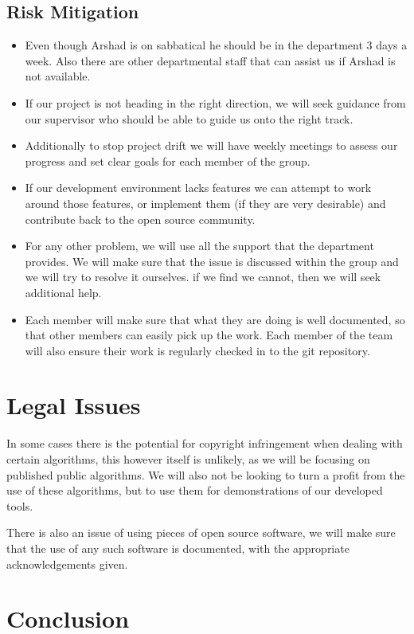 \documentclass[a4paper]{article}
\begin{document}
\subsection{Risk Mitigation}
\begin{itemize}
	\item Even though Arshad is on sabbatical he should be in the department 3 days a week. Also there are other departmental staff that can assist us if Arshad is not available.
	\item If our project is not heading in the right direction, we will seek guidance from our supervisor who should be able to guide us onto the right track.
	\item Additionally to stop project drift we will have weekly meetings to assess our progress and set clear goals for each member of the group.
	\item If our development environment lacks features we can attempt to work around those features, or implement them (if they are very desirable) and contribute back to the open source community.
	\item For any other problem, we will use all the support that the department provides. We will make sure that the issue is discussed within the group and we will try to resolve it ourselves. if we find we cannot, then we will seek additional help.
	\item Each member will make sure that what they are doing is well documented, so that other members can easily pick up the work. Each member of the team will also ensure their work is regularly checked in to the git repository.
\end{itemize}


\section{Legal Issues}
In some cases there is the potential for copyright infringement when dealing with certain algorithms, this however itself is unlikely, as we will be focusing on published public algorithms. We will also not be looking to turn a profit from the use of these algorithms, but to use them for demonstrations of our developed tools.

There is also an issue of using pieces of open source software, we will make sure that the use of any such software is documented, with the appropriate acknowledgements given.

\section{Conclusion}
\end{document}
